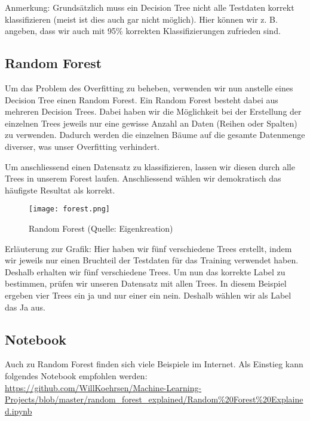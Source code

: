 Anmerkung: Grundsätzlich muss ein Decision Tree nicht alle Testdaten korrekt klassifizieren (meist ist dies auch gar nicht möglich). Hier können wir z. B. angeben, dass wir auch mit 95\% korrekten Klassifizierungen zufrieden sind.
\subsection{Random Forest}
Um das Problem des Overfitting zu beheben, verwenden wir nun anstelle eines Decision Tree einen Random Forest. Ein Random Forest besteht dabei aus mehreren Decision Trees. Dabei haben wir die Möglichkeit bei der Erstellung der einzelnen Trees jeweils nur eine gewisse Anzahl an Daten (Reihen oder Spalten) zu verwenden.
Dadurch werden die einzelnen Bäume auf die gesamte Datenmenge diverser, was unser Overfitting verhindert.

Um anschliessend einen Datensatz zu klassifizieren, lassen wir diesen durch alle Trees in unserem Forest laufen. Anschliessend wählen wir demokratisch das häufigste Resultat als korrekt. 

\begin{figure}[h!]
	\centering
	\texttt{[image: forest.png]}
	\caption{Random Forest (Quelle: Eigenkreation)}
\end{figure}
Erläuterung zur Grafik: Hier haben wir fünf verschiedene Trees erstellt, indem wir jeweils nur einen Bruchteil der Testdaten für das Training verwendet haben. Deshalb erhalten wir fünf verschiedene Trees. Um nun das korrekte Label zu bestimmen, prüfen wir unseren Datensatz mit allen Trees. In diesem Beispiel ergeben vier Trees ein ja und nur einer ein nein. Deshalb wählen wir als Label das Ja aus.
\subsection{Notebook}
Auch zu Random Forest finden sich viele Beispiele im Internet. Als Einstieg kann folgendes Notebook empfohlen werden: 
\url{https://github.com/WillKoehrsen/Machine-Learning-Projects/blob/master/random_forest_explained/Random\%20Forest\%20Explained.ipynb}
